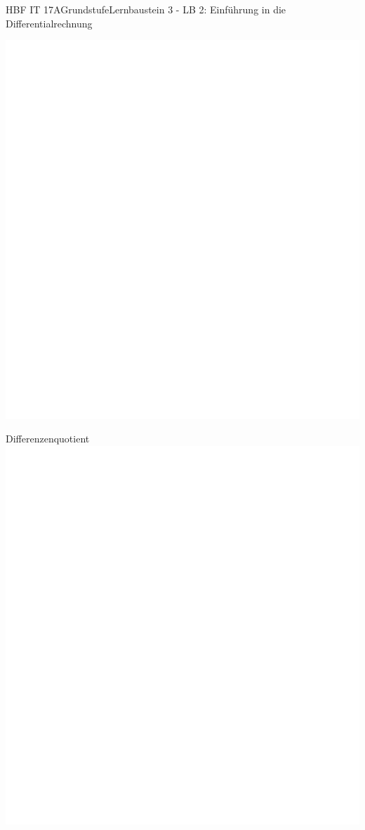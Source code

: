 \documentclass[oneside,openany,headings=optiontotoc,11pt,numbers=noenddot]{scrreprt}
\begin{document}
\begin{worksheet}{HBF IT 17A}{Grundstufe}{Lernbaustein 3 - LB 2: Einführung in die Differentialrechnung}
		\begin{framed}
			\includegraphics[height=0.6\textheight]{../empty.jpg}
		\end{framed}
		\begin{framed}
			\tiny{\color{codegray}Differenzenquotient}\\
			\includegraphics[height=0.3\textheight]{../empty.jpg}
		\end{framed}		
	\end{worksheet}
\end{document}
